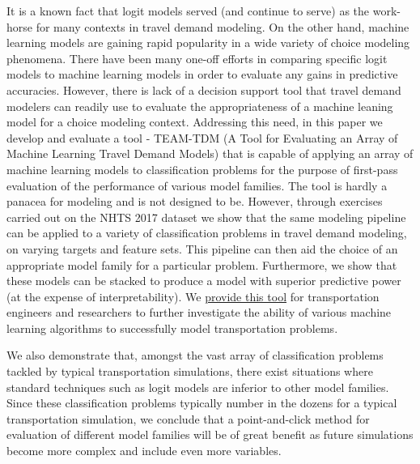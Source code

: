 \documentclass[numbered]{trbunofficial}
\begin{document}
It is a known fact that logit models served (and continue to serve) as the work-horse for many contexts in travel demand modeling. 
 On the other hand, machine learning models are gaining rapid popularity in a wide variety of choice modeling phenomena. 
 There have been many one-off efforts in comparing specific logit models to machine learning models in order to evaluate any gains in predictive accuracies. 
 However, there is lack of a decision support tool that travel demand modelers can readily use to evaluate the appropriateness of a machine leaning model for a choice modeling context. 
 Addressing this need, in this paper we develop and evaluate a tool - TEAM-TDM (A Tool for Evaluating an Array of Machine Learning Travel Demand Models) that is capable of applying an array of machine learning models to classification problems for the purpose of first-pass evaluation of the performance of various model families.
 The tool is hardly a panacea for modeling and is not designed to be.
 However, through exercises carried out on the NHTS 2017  dataset we show that the same modeling pipeline can be applied to a variety of classification problems in travel demand modeling, on varying targets and feature sets.
 This pipeline can then aid the choice of an appropriate model family for a particular problem.
 Furthermore, we show that these models can be stacked to produce a model with superior predictive power (at the expense of interpretability).
 We \href{https://bitbucket.org/gitpushoriginmaster/team-tdm/}{provide this tool} for transportation engineers and researchers to further investigate the ability of various machine learning algorithms to successfully model transportation problems.

We also demonstrate that, amongst the vast array of classification problems tackled by typical transportation simulations, there exist situations where standard techniques such as logit models are inferior to other model families.
 Since these classification problems typically number in the dozens for a typical transportation simulation, we conclude that a point-and-click method for evaluation of different model families will be of great benefit as future simulations become more complex and include even more variables.
\end{document}

